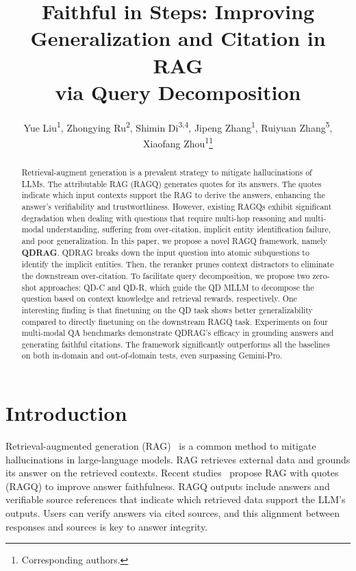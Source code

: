\documentclass[letterpaper]{article} %
\title{Faithful in Steps: Improving Generalization and Citation in RAG \\via Query Decomposition}
\author {
    Yue Liu\textsuperscript{\rm 1}\footnotemark[1],
    Zhongying Ru\textsuperscript{\rm 2},
    Shimin Di\textsuperscript{\rm 3,\rm 4},
    Jipeng Zhang\textsuperscript{\rm 1},
    Ruiyuan Zhang\textsuperscript{\rm 5},
    Xiaofang Zhou\textsuperscript{\rm 1}\thanks{Corresponding authors.}
}
\begin{document}
\maketitle

\begin{abstract}
Retrieval-augment generation is a prevalent strategy to mitigate hallucinations of LLMs. The attributable RAG (RAGQ) generates quotes for its answers. The quotes indicate which input contexts support the RAG to derive the answers, enhancing the answer's verifiability and trustworthiness.
However, existing RAGQs exhibit significant degradation when dealing with questions that require multi-hop reasoning and multi-modal understanding, suffering from over-citation, implicit entity identification failure, and poor generalization.
In this paper, we propose a novel RAGQ framework, namely \textbf{QDRAG}. 
QDRAG breaks down the input question into atomic subquestions to identify the implicit entities. Then, the reranker prunes context distractors to eliminate the downstream over-citation. To facilitate query decomposition, we propose two zero-shot approaches: QD-C and QD-R, which guide the QD MLLM to decompose the question based on context knowledge and retrieval rewards, respectively.
One interesting finding is that finetuning on the QD task shows better generalizability compared to directly finetuning on the downstream RAGQ task. 
Experiments on four multi-modal QA benchmarks demonstrate QDRAG's efficacy in grounding answers and generating faithful citations. The framework significantly outperforms all the baselines on both in-domain and out-of-domain tests, even surpassing Gemini-Pro.
\end{abstract}


\section{Introduction}

Retrieval-augmented generation (RAG)~\cite{abootorabi2025ask} is a common method to mitigate hallucinations in large-language models.
RAG retrieves external data and grounds its answer on the retrieved contexts. 
Recent studies~\cite{huang-etal-2024-learning,song2025measuring} propose RAG with quotes (RAGQ) to improve answer faithfulness. 
RAGQ outputs include answers and verifiable source references that indicate which retrieved data support the LLM's outputs. Users can verify answers via cited sources, and this alignment between responses and sources is key to answer integrity.
\end{document}
